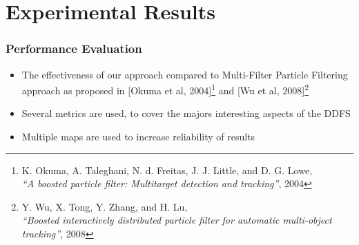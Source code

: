 \section{Experimental Results}

\begin{frame}
	\frametitle{Performance Evaluation}
	\begin{itemize}
		\item The effectiveness of our approach compared to Multi-Filter Particle Filtering approach as proposed in
			  [Okuma et al, 2004]\footnote{K. Okuma, A. Taleghani, N. d. Freitas, J. J. Little, and D. G. Lowe, \\
			  \hspace{0.6cm}\emph{``A boosted particle filter: Multitarget detection and tracking''}, 2004} and 
			  [Wu et al, 2008]\footnote{Y. Wu, X. Tong, Y. Zhang, and H. Lu,\\\hspace{0.6cm}\emph{``Boosted
			  interactively distributed particle filter for automatic multi-object\\\hspace{0.6cm}tracking''}, 2008}
		\item Several metrics are used, to cover the majors interesting aspects of the DDFS
		\item Multiple maps are used to increase reliability of results
	\end{itemize}
\end{frame}

